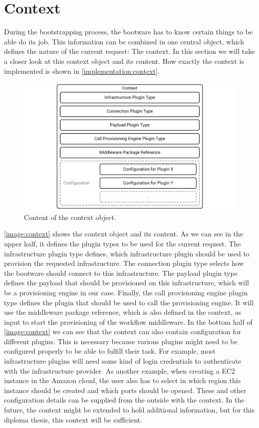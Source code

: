 \section{Context}
\label{design:context}

During the bootstrapping process, the bootware has to know certain things to be able do its job.
This information can be combined in one central object, which defines the nature of the current request: The context.
In this section we will take a closer look at this context object and its content.
How exactly the context is implemented is shown in \autoref{implementation:context}.

\begin{figure}[!htbp]
	\centering
	\includegraphics[resolution=600]{design/assets/context}
	\caption{Content of the context object.}
	\label{image:context}
\end{figure}

\autoref{image:context} shows the context object and its content.
As we can see in the upper half, it defines the plugin types to be used for the current request.
The infrastructure plugin type defines, which infrastructure plugin should be used to provision the requested infrastructure.
The connection plugin type selects how the bootware should connect to this infrastructure.
The payload plugin type defines the payload that should be provisioned on this infrastructure, which will be a provisioning engine in our case.
Finally, the call provisioning engine plugin type defines the plugin that should be used to call the provisioning engine.
It will use the middleware package reference, which is also defined in the context, as input to start the provisioning of the workflow middleware.
In the bottom half of \autoref{image:context} we can see that the context can also contain configuration for different plugins.
This is necessary because various plugins might need to be configured properly to be able to fulfill their task.
For example, most infrastructure plugins will need some kind of login credentials to authenticate with the infrastructure provider.
As another example, when creating a EC2 instance in the Amazon cloud, the user also has to select in which region this instance should be created and which ports should be opened.
These and other configuration details can be supplied from the outside with the context.
In the future, the context might be extended to hold additional information, but for this diploma thesis, this context will be sufficient.

